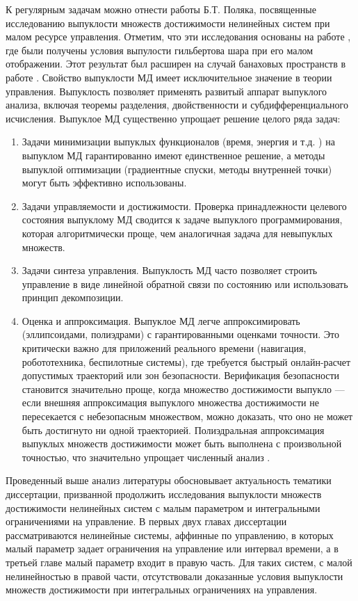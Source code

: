 \documentclass[../main.tex]{subfiles}
\begin{document}
К регулярным задачам можно отнести работы Б.Т. Поляка, посвященные исследованию выпуклости множеств достижимости нелинейных систем при малом ресурсе управления.
Отметим, что эти исследования основаны на работе \cite{Polyak2001}, где были получены условия выпулости гильбертова шара при его малом отображении. 
Этот результат был расширен на случай банаховых пространств в работе \cite{Ledyaev}.
Свойство выпуклости МД имеет исключительное значение в теории управления. 
Выпуклость позволяет применять развитый аппарат выпуклого анализа, включая теоремы разделения, двойственности и субдифференциального исчисления.
Выпуклое МД существенно упрощает решение целого ряда задач:
\begin{enumerate}
	\item Задачи минимизации выпуклых функционалов (время, энергия и т.д. ) на выпуклом МД гарантированно имеют единственное решение, а методы выпуклой оптимизации (градиентные спуски, методы внутренней точки) могут быть эффективно использованы.
	\item Задачи управляемости и достижимости. 
	Проверка принадлежности целевого состояния выпуклому МД сводится к задаче выпуклого программирования, которая алгоритмически проще, чем аналогичная задача для невыпуклых множеств.
	\item Задачи синтеза управления. 
	Выпуклость МД часто позволяет строить управление в виде линейной обратной связи по состоянию или использовать принцип декомпозиции.
	\item Оценка и аппроксимация. 
	Выпуклое МД легче аппроксимировать (эллипсоидами, полиэдрами) с гарантированными оценками точности. 
	Это критически важно для приложений реального времени (навигация,  робототехника, беспилотные системы), где требуется быстрый онлайн-расчет допустимых траекторий или зон безопасности. 
	Верификация безопасности становится значительно проще, когда множество достижимости выпукло — если внешняя аппроксимация выпуклого множества достижимости не пересекается с небезопасным множеством, можно доказать, что оно не может быть достигнуто ни одной траекторией. 
	Полиэдральная аппроксимация выпуклых множеств достижимости может быть выполнена с произвольной точностью, что значительно упрощает численный анализ .
\end{enumerate}

Проведенный выше анализ литературы обосновывает актуальность тематики диссертации, призванной продолжить исследования выпуклости множеств достижимости нелинейных систем с малым параметром и интегральными ограничениями на управление.  
В первых двух главах диссертации рассматриваются нелинейные системы, аффинные по управлению, в которых малый параметр задает ограничения на управление или интервал времени, а в третьей главе малый параметр входит в правую часть.  
Для таких систем, с малой нелинейностью в правой части,  отсутствовали доказанные условия выпуклости множеств достижимости при интегральных ограничениях на управления.
\end{document}
